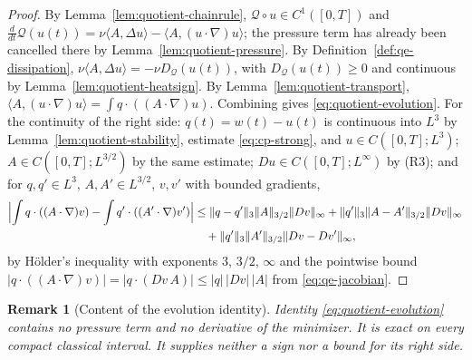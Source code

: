 \documentclass[11pt]{article}
\newtheorem{remark}[theorem]{Remark}
\theoremstyle{definition}
\theoremstyle{plain}
\newcommand{\norm}[1]{\lVert #1\rVert}
\begin{document}
\begin{proof}
By Lemma~\ref{lem:quotient-chainrule}, $\mathcal Q\circ u\in C^1([0,T])$
and
$\frac d{dt}\mathcal Q(u(t))=\nu\langle A,\Delta u\rangle-\langle A,(u\cdot\nabla)u\rangle$;
the pressure term has already been cancelled there by
Lemma~\ref{lem:quotient-pressure}.  By Definition~\ref{def:qe-dissipation},
$\nu\langle A,\Delta u\rangle=-\nu D_{\mathcal Q}(u(t))$, with
$D_{\mathcal Q}(u(t))\ge0$ and continuous by
Lemma~\ref{lem:quotient-heatsign}.  By Lemma~\ref{lem:quotient-transport},
$\langle A,(u\cdot\nabla)u\rangle=\int q\cdot((A\cdot\nabla)u)$.  Combining
gives \eqref{eq:quotient-evolution}.  For the continuity of the right
side: $q(t)=w(t)-u(t)$ is continuous into $L^3$ by
Lemma~\ref{lem:quotient-stability}, estimate \eqref{eq:cp-strong},
and $u\in C([0,T];L^3)$; $A\in C([0,T];L^{3/2})$ by the same estimate;
$Du\in C([0,T];L^\infty)$ by (R3); and for $q,q'\in L^3$,
$A,A'\in L^{3/2}$, $v,v'$ with bounded gradients,
\[
\begin{aligned}
 \Bigl|\int q\cdot((A\cdot\nabla)v)-\int q'\cdot((A'\cdot\nabla)v')\Bigr|
 &\le\norm{q-q'}_3\norm A_{3/2}\norm{Dv}_\infty
 +\norm{q'}_3\norm{A-A'}_{3/2}\norm{Dv}_\infty\\
 &\quad+\norm{q'}_3\norm{A'}_{3/2}\norm{Dv-Dv'}_\infty ,
\end{aligned}
\]
by H\"older's inequality with exponents $3$, $3/2$, $\infty$ and the
pointwise bound $|q\cdot((A\cdot\nabla)v)|=|q\cdot(Dv\,A)|\le|q|\,|Dv|\,|A|$
from \eqref{eq:qe-jacobian}.
\end{proof}

\begin{remark}[Content of the evolution identity]\label{rem:qe-evolution-scope}
Identity \eqref{eq:quotient-evolution} contains no pressure term and no
derivative of the minimizer.  It is exact on every compact classical
interval.  It supplies neither a sign nor a bound for its right side.
\end{remark}

\end{document}
